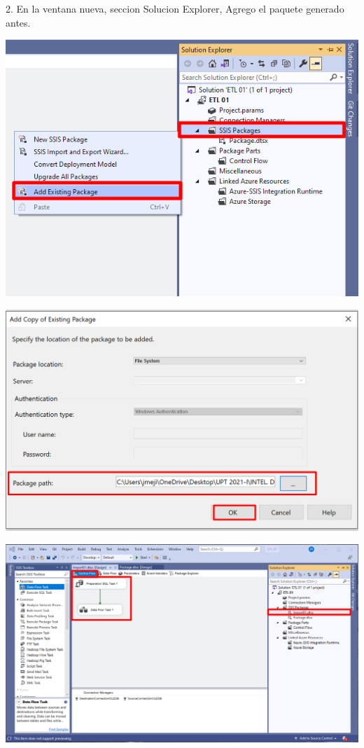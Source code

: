 \documentclass[12pt,letterpaper]{article}
\begin{document}
2.  En la ventana nueva, seccion Solucion Explorer, Agrego el paquete generado antes.
	\begin{center}
	\includegraphics[width=14cm]{./img/15}
	\vspace{2cm}
	\end{center}
	\begin{center}
		\includegraphics[width=14cm]{./img/16}
		\vspace{2cm}
	\end{center}
	\begin{center}
		\includegraphics[width=18cm]{./img/17}
		\vspace{2cm}
	\end{center}	
\end{document}
